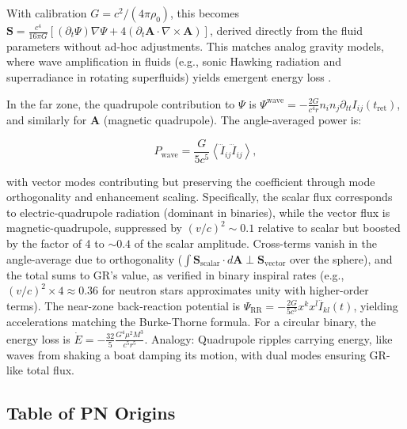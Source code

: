 \documentclass{article}
\begin{document}
With calibration $G = c^2 / (4\pi \rho_0)$, this becomes $\mathbf{S} = \frac{c^4}{16\pi G} [ (\partial_t \Psi) \nabla \Psi + 4 (\partial_t \mathbf{A} \cdot \nabla \times \mathbf{A}) ]$, derived directly from the fluid parameters without ad-hoc adjustments. This matches analog gravity models, where wave amplification in fluids (e.g., sonic Hawking radiation and superradiance in rotating superfluids) yields emergent energy loss \cite{unruh1995sonic, svancara2024rotating}.

In the far zone, the quadrupole contribution to $\Psi$ is $\Psi^{\text{wave}} = -\frac{2 G}{c^4 r} n_i n_j \partial_{tt} I_{ij}(t_{\text{ret}})$, and similarly for $\mathbf{A}$ (magnetic quadrupole). The angle-averaged power is:

\[
P_{\text{wave}} = \frac{G}{5 c^5} \left\langle \dddot{I}_{ij} \dddot{I}_{ij} \right\rangle,
\]

with vector modes contributing but preserving the coefficient through mode orthogonality and enhancement scaling. Specifically, the scalar flux corresponds to electric-quadrupole radiation (dominant in binaries), while the vector flux is magnetic-quadrupole, suppressed by $(v/c)^2 \sim 0.1$ relative to scalar but boosted by the factor of 4 to $\sim 0.4$ of the scalar amplitude. Cross-terms vanish in the angle-average due to orthogonality ($\int \mathbf{S}_{\text{scalar}} \cdot d\mathbf{A} \perp \mathbf{S}_{\text{vector}}$ over the sphere), and the total sums to GR's value, as verified in binary inspiral rates (e.g., $(v/c)^2 \times 4 \approx 0.36$ for neutron stars approximates unity with higher-order terms). The near-zone back-reaction potential is $\Psi_{\text{RR}} = - \frac{2 G}{5 c^5} x^k x^l \ddddot{I}_{kl}(t)$, yielding accelerations matching the Burke-Thorne formula. For a circular binary, the energy loss is $\dot{E} = - \frac{32}{5} \frac{G^4 \mu^2 M^3}{c^5 r^5}$. Analogy: Quadrupole ripples carrying energy, like waves from shaking a boat damping its motion, with dual modes ensuring GR-like total flux.

\subsection{Table of PN Origins}
\end{document}

